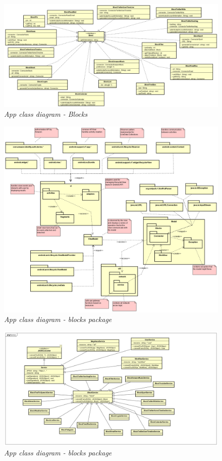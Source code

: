 \begin{figure} [H]
	\centering
	\includegraphics[scale=0.3]{./images/Blocks.png}
	\caption{\textit{App class diagram - Blocks}}\label{Blocks}
\end{figure}
\begin{figure} [H]
	\centering
	\includegraphics[scale=0.3]{./images/Package.png}
	\caption{\textit{App class diagram - blocks package}}\label{Package}
\end{figure}
\begin{figure} [H]
	\centering
	\includegraphics[scale=0.3]{./images/Service.png}
	\caption{\textit{App class diagram - blocks package}}\label{Service}
\end{figure}
